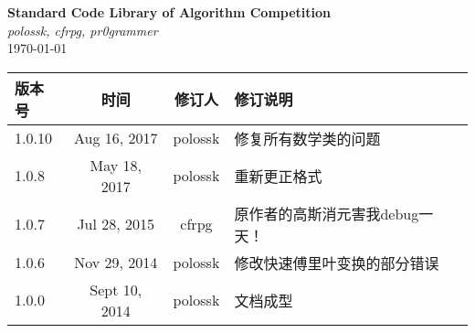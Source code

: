 \documentclass[12pt,a4paper]{book}
\title{\strtitle}
\author{\strauthor}
\date{\today}
\newcommand\strtitle{Standard Code Library of Algorithm Competition}
\newcommand\strauthor{polossk, cfrpg, pr0grammer}
\begin{document}
\frontmatter
\begin{titlepage}
\vspace*{\fill}
\begin{center}
    {\Huge \bf \strtitle} \\
    \vspace{1em}
    {\Large \it \strauthor} \\
    \vspace{1em}
    {\large \today} \\
\end{center}
\vspace{1em}
\begin{longtable}{|l|c|c|l|}
    \hline
    版本号 & 时间 & 修订人 & 修订说明 \\
    \hline
    1.0.10 & Aug 16, 2017 & polossk & 修复所有数学类的问题 \\
    \hline
    1.0.8 & May 18, 2017 & polossk & 重新更正格式 \\
    \hline
    1.0.7 & Jul 28, 2015 & cfrpg & 原作者的高斯消元害我debug一天！ \\
    \hline
    1.0.6 & Nov 29, 2014 & polossk & 修改快速傅里叶变换的部分错误 \\
    \hline
    1.0.0 & Sept 10, 2014 & polossk & 文档成型 \\
    \hline
\end{longtable}
\end{titlepage}
\thispagestyle{fancy}
\clearpage
{}
{}
\begin{multicols}{2}
\tableofcontents
\end{multicols}
\clearpage


\mainmatter
% 

% 




\end{document}
